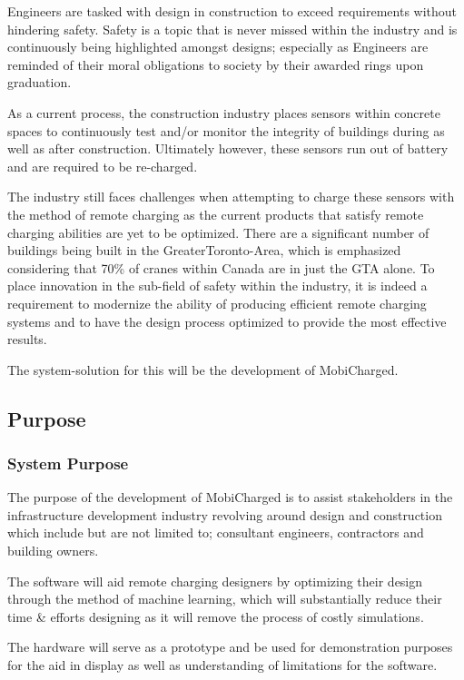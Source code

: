 \documentclass[12pt, titlepage]{article}
\begin{document}
Engineers are tasked with design in construction to exceed requirements without hindering safety. Safety is a topic that is never missed within the industry and is continuously being highlighted amongst designs; especially as Engineers are reminded of their moral obligations to society by their awarded rings upon graduation. 
\par
As a current process, the construction industry places sensors within concrete spaces to continuously test and/or monitor the integrity of buildings during as well as after construction. Ultimately however, these sensors run out of battery and are required to be re-charged.
\par
The industry still faces challenges when attempting to charge these sensors with the method of remote charging as the current products that satisfy remote charging abilities are yet to be optimized. There are a significant number of buildings being built in the GreaterToronto-Area, which is emphasized considering that 70\% of cranes within Canada are in just the GTA alone. To place innovation in the sub-field of safety within the industry, it is indeed a requirement to modernize the ability of producing efficient remote charging systems and to have the design process optimized to provide the most effective results.
\par
The system-solution for this will be the development of MobiCharged. 


\subsection{Purpose}

\subsubsection{System Purpose}
The purpose of the development of MobiCharged is to assist stakeholders in the infrastructure development industry revolving around design and construction which include but are not limited to; consultant engineers, contractors and building owners. 
\par
The software will aid remote charging designers by optimizing their design through the method of machine learning, which will substantially reduce their time \& efforts designing as it will remove the process of costly simulations. 
\par
The hardware will serve as a prototype and be used for demonstration purposes for the aid in display as well as understanding of limitations for the software. 
\end{document}
